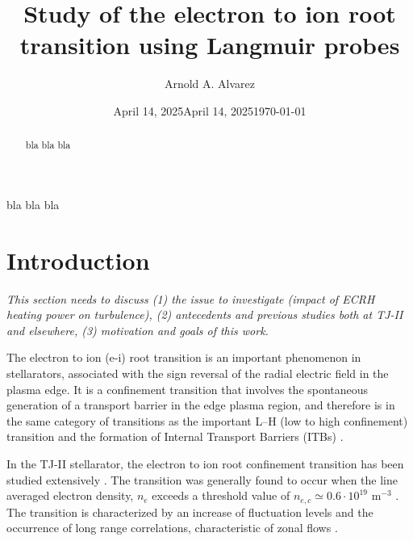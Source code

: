 \documentclass[preprint,12pt,authoryear]{elsarticle}
\date{April 14, 2025}
\begin{document}
\begin{frontmatter}
%
\title{Study of the electron to ion root transition using Langmuir probes}
\date{April 14, 2025}
\author{Arnold A. Alvarez}%

%        
%
\date{\today}
%
\begin{abstract}
    bla bla bla 
\end{abstract}

\begin{keyword}
    bla bla bla
\end{keyword}
%
\end{frontmatter}

\section{Introduction}


{\em This section needs to discuss (1) the issue to investigate (impact of ECRH heating power on turbulence), (2) antecedents and previous studies both at TJ-II and elsewhere, (3) motivation and goals of this work.}

The electron to ion (e-i) root transition is an important phenomenon in stellarators, associated with the sign reversal of the radial electric field in the plasma edge.
It is a confinement transition that involves the spontaneous generation of a transport barrier in the edge plasma region, and therefore is in the same category of transitions as the important L--H (low to high confinement) transition and the formation of Internal Transport Barriers (ITBs) \cite{Ida:2020}.

In the TJ-II stellarator, the electron to ion root confinement transition has been studied extensively \cite{Hidalgo:2006b}.
The transition was generally found to occur when the line averaged electron density, $n_e$ exceeds a threshold value of $n_{e,c} \simeq 0.6 \cdot 10^{19}$ m$^{-3}$ \cite{Pedrosa:2005,Pedrosa:2005c}.
The transition is characterized by an increase of fluctuation levels and the occurrence of long range correlations, characteristic of zonal flows \cite{Pedrosa:2008}.
\end{document}
